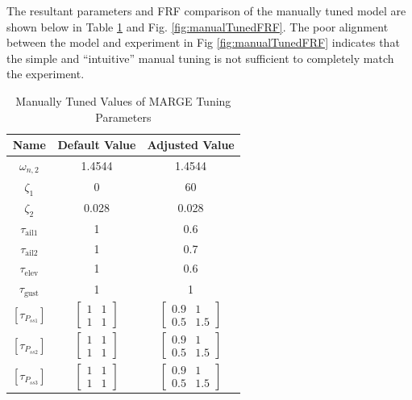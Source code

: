 The resultant parameters and FRF comparison of the manually tuned model are shown below in Table \ref{tab:manualTuning} and Fig. \ref{fig:manualTunedFRF}. The poor alignment between the model and experiment in Fig \ref{fig:manualTunedFRF} indicates that the simple and ``intuitive'' manual tuning is not sufficient to completely match the experiment.
\begin{table}[h]
	\centering
	\label{tab:manualTuning}
	\caption{Manually Tuned Values of MARGE Tuning Parameters}
	\begin{tabular}{ccc}
		\hline\hline
		Name & Default Value & Adjusted Value \\
		\hline
		$\omega_{n,2}$ & 1.4544 & 1.4544 \\
		$\zeta_1$ & 0 & 60 \\
		$\zeta_2$ & 0.028 & 0.028 \\
		$\tau_\text{ail1}$ & 1 & 0.6 \\
		$\tau_\text{ail2}$ & 1 & 0.7 \\
		$\tau_\text{elev}$ & 1 & 0.6 \\
		$\tau_\text{gust}$ & 1 & 1 \\
		$\left[\tau_{P_{ss1}}\right]$ & $\begin{bmatrix} 1 & 1 \\ 1 & 1 \end{bmatrix}$ & $\begin{bmatrix} 0.9 & 1 \\ 0.5 & 1.5 \end{bmatrix}$ \\
		$\left[\tau_{P_{ss2}}\right]$ & $\begin{bmatrix} 1 & 1 \\ 1 & 1 \end{bmatrix}$ & $\begin{bmatrix} 0.9 & 1 \\ 0.5 & 1.5 \end{bmatrix}$ \\
		$\left[\tau_{P_{ss3}}\right]$ & $\begin{bmatrix} 1 & 1 \\ 1 & 1 \end{bmatrix}$ & $\begin{bmatrix} 0.9 & 1 \\ 0.5 & 1.5 \end{bmatrix}$ \\
		\hline\hline
	\end{tabular}
\end{table}

